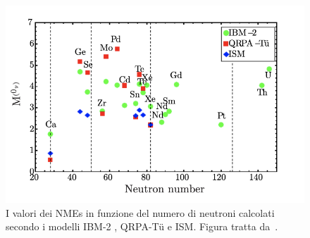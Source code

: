 \begin{figure} [!t]
	\centering
	\includegraphics[scale=0.4]{Grafici/NME.png}
	\caption{I valori dei NMEs in funzione del numero di neutroni calcolati secondo i modelli IBM-2 \cite{barea:prc13}, QRPA-T\"{u}\cite{simkovic:prc13} e ISM\cite{menendez:npa08}. Figura tratta da~\cite{barea:prc15}.} \label{fig:NME}
\end{figure}



\section{}


